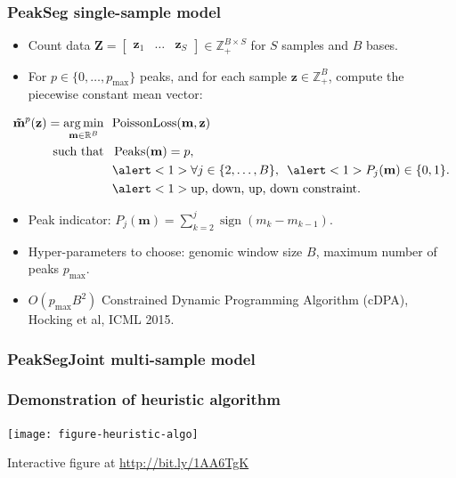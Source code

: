 \documentclass{beamer}
\DeclareMathOperator*{\argmin}{arg\,min}
\DeclareMathOperator*{\Peaks}{Peaks}
\newcommand{\sign}{\operatorname{sign}}
\newcommand{\RR}{\mathbb R}
\newcommand{\ZZ}{\mathbb Z}
\begin{document}
\begin{frame}
  \frametitle{PeakSeg single-sample model}

  \begin{itemize}
    \item Count data $\mathbf Z = \left[
    \begin{array}{ccc}
      \mathbf z_1 & \dots & \mathbf z_S
    \end{array}
    \right]\in\ZZ_+^{B\times S}$ for $S$ samples and $B$ bases.
  \item For $p\in\{0, \dots, p_{\text{max}}\}$ peaks, and for each
    sample $\mathbf z\in\ZZ_+^B$, compute the piecewise constant mean
    vector:
  \end{itemize}
  \begin{align*}
    \mathbf{\tilde m}^p(\mathbf z)  =
    \argmin_{\mathbf m\in\RR^{B}} &\ \ 
    \text{PoissonLoss}(\mathbf m, \mathbf z) 
    \\
    \text{such that} &\ \ 
    \Peaks(\mathbf m)=p,  \\
    &\ \  \alert<1>{\forall j\in\{2, \dots, B\},} 
    \ \ \alert<1>{P_j(\mathbf m) \in\{0, 1\}.}\\
    &\ \  \alert<1>{\text{up, down, up, down constraint.}}\\
  \end{align*}
  \vskip -1cm
  \begin{itemize}
  \item Peak indicator: $P_j(\mathbf m) = \sum_{k=2}^j \sign( m_{k} - m_{k-1} )$.
  \item Hyper-parameters to choose: genomic window size $B$, maximum
    number of peaks $p_{\text{max}}$.
  \item $O(p_{\text{max}} B^2)$ Constrained Dynamic Programming
    Algorithm (cDPA), Hocking et al, ICML 2015.
  \end{itemize}
\end{frame}



\begin{frame}
  \frametitle{PeakSegJoint multi-sample model}
  
\end{frame}

\begin{frame}
  \frametitle{Demonstration of heuristic algorithm}

  \texttt{[image: figure-heuristic-algo]}

  Interactive figure at \url{http://bit.ly/1AA6TgK}
\end{frame}
\end{document}
